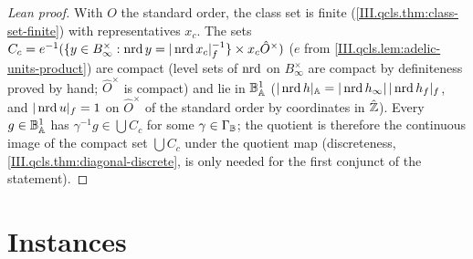 \begin{proof}[Lean proof]
With $O$ the standard order, the class set is finite (\cref{III.qcls.thm:class-set-finite}) with representatives $x_c$. The sets $C_c=e^{-1}(\{y\in B_\infty^\times:\operatorname{nrd} y=|\operatorname{nrd} x_c|_f^{-1}\}\times x_c\hat O^\times)$ ($e$ from \cref{III.qcls.lem:adelic-units-product}) are compact (level sets of $\operatorname{nrd}$ on $B_\infty^\times$ are compact by definiteness proved by hand; $\hat O^\times$ is compact) and lie in $\mathbb{B}_{\mathbb{A}}^1$ ($|\operatorname{nrd} h|_{\mathbb{A}}=|\operatorname{nrd} h_\infty|\,|\operatorname{nrd} h_f|_f$, and $|\operatorname{nrd} u|_f=1$ on $\hat O^\times$ of the standard order by coordinates in $\hat{\mathbb{Z}}$). Every $g\in\mathbb{B}_{\mathbb{A}}^1$ has $\gamma^{-1}g\in\bigcup C_c$ for some $\gamma\in\Gamma_{\mathbb{B}}$; the quotient is therefore the continuous image of the compact set $\bigcup C_c$ under the quotient map (discreteness, \cref{III.qcls.thm:diagonal-discrete}, is only needed for the first conjunct of the statement).
\end{proof}


\section{Instances}\label{sec:qcls-instances}

